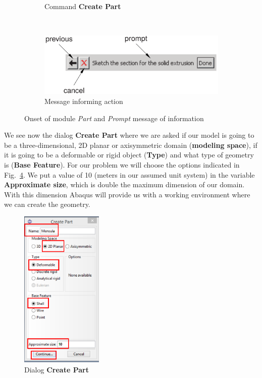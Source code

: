 \begin{enumerate}
\begin{figure}[H]
\begin{subfigure}{0.25\textwidth}
    \caption{Command \textbf{Create Part}}
    \label{figu02}
  \end{subfigure}%
  ~ %
  \begin{subfigure}{0.65\textwidth}
    \includegraphics[width=\textwidth]{./body/images/imagen03}
    \caption{Message informing action}
    \label{figu03}
  \end{subfigure}
  \caption{Onset of module \textit{Part} and \textit{Prompt} message
    of information}
\end{figure}

We see now the dialog \textbf{Create Part} where we are asked if our
model is going to be a three-dimensional, 2D planar or axisymmetric
domain (\textbf{modeling space}), if it is going to be a deformable or
rigid object (\textbf{Type}) and what type of geometry is
(\textbf{Base Feature}). For our problem we will choose the options
indicated in Fig.~\ref{figu04}.  We put a value of 10 (meters in our
assumed unit system) in the variable \textbf{Approximate size}, which
is double the maximum dimension of our domain. With this dimension
Abaqus will provide us with a working environment where we can create
the geometry.


\begin{figure}[!h]
  \begin{center}
    \includegraphics[width=0.35\textwidth]{./body/images/imagen04.pdf}
  \end{center}
  \caption{Dialog \textbf{Create Part}}
  \label{figu04}
\end{figure}


\end{enumerate}
